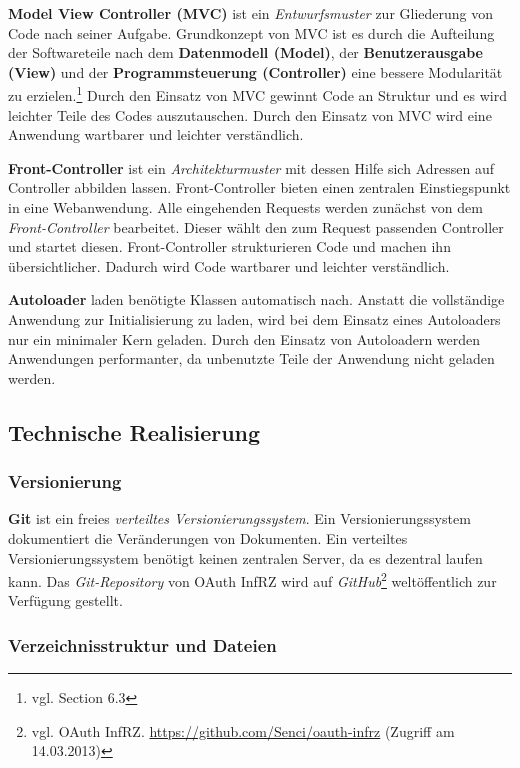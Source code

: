 \documentclass[12pt,a4paper,pointednumbers,abstracton]{scrartcl}
\begin{document}
\textbf{Model View Controller (MVC)} ist ein \emph{Entwurfsmuster} zur Gliederung von Code nach seiner Aufgabe.
Grundkonzept von MVC ist es durch die Aufteilung der Softwareteile nach dem \textbf{Datenmodell (Model)}, der \textbf{Benutzerausgabe (View)} und der \textbf{Programmsteuerung (Controller)} eine bessere Modularität zu erzielen.\footnote{vgl. \cite{Som10} Section 6.3}
Durch den Einsatz von MVC gewinnt Code an Struktur und es wird leichter Teile des Codes auszutauschen.
Durch den Einsatz von MVC wird eine Anwendung wartbarer und leichter verständlich.

\textbf{Front-Controller} ist ein \emph{Architekturmuster} mit dessen Hilfe sich Adressen auf Controller abbilden lassen.
Front-Controller bieten einen zentralen Einstiegspunkt in eine Webanwendung.
Alle eingehenden Requests werden zunächst von dem \emph{Front-Controller} bearbeitet.
Dieser wählt den zum Request passenden Controller und startet diesen.
Front-Controller strukturieren Code und machen ihn übersichtlicher.
Dadurch wird Code wartbarer und leichter verständlich.

\textbf{Autoloader} laden benötigte Klassen automatisch nach.
Anstatt die vollständige Anwendung zur Initialisierung zu laden, wird bei dem Einsatz eines Autoloaders nur ein minimaler Kern geladen.
Durch den Einsatz von Autoloadern werden Anwendungen performanter, da unbenutzte Teile der Anwendung nicht geladen werden.

\subsection{Technische Realisierung}

\subsubsection{Versionierung}

\textbf{Git} ist ein freies \emph{verteiltes Versionierungssystem}.
Ein Versionierungssystem dokumentiert die Veränderungen von Dokumenten.
Ein verteiltes Versionierungssystem benötigt keinen zentralen Server, da es dezentral laufen kann.
Das \emph{Git-Repository} von OAuth InfRZ wird auf \emph{GitHub}\footnote{vgl. OAuth InfRZ. \url{https://github.com/Senci/oauth-infrz} (Zugriff am 14.03.2013)} weltöffentlich zur Verfügung gestellt.

\subsubsection{Verzeichnisstruktur und Dateien}
\end{document}
